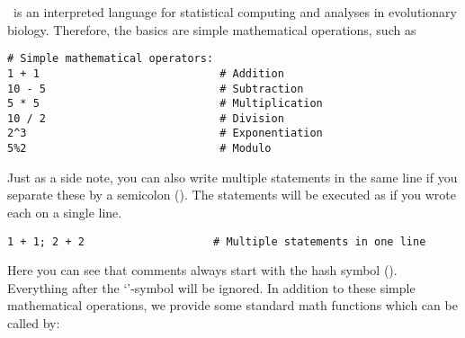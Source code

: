 \Rev~is an interpreted language for statistical computing and analyses in evolutionary biology. Therefore, the basics are simple mathematical operations, such as 
{\tt \begin{snugshade*}
\begin{lstlisting}    
# Simple mathematical operators:
1 + 1                            # Addition
10 - 5                           # Subtraction
5 * 5                            # Multiplication
10 / 2                           # Division
2^3                              # Exponentiation
5%2                              # Modulo
\end{lstlisting}
\end{snugshade*}}
Just as a side note, you can also write multiple statements in the same line if you separate these by a semicolon (\cl{;}).
The statements will be executed as if you wrote each on a single line.
{\tt \begin{snugshade*}
\begin{lstlisting}    
1 + 1; 2 + 2                    # Multiple statements in one line
\end{lstlisting}
\end{snugshade*}}
    
Here you can see that comments always start with the hash symbol (\cl{\#}). 
Everything after the `\cl{\#}'-symbol will be ignored.
In addition to these simple mathematical operations, we provide some standard math functions which can be called by:
    
